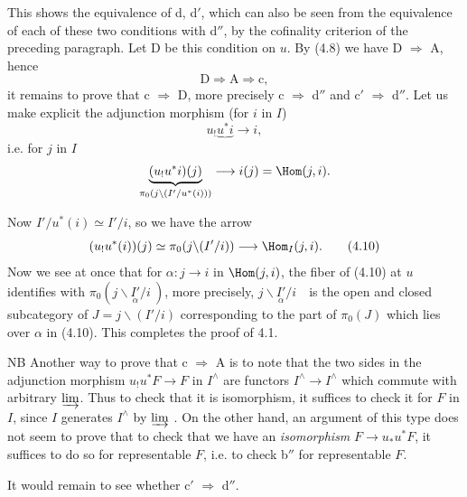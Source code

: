 This shows the equivalence of d, d$'$, which can also be seen from the equivalence of each of these two conditions with d$''$, by the cofinality criterion of the preceding paragraph. Let D be this condition on $u$. By (4.8) we have D $\Longrightarrow$ A, hence %
\[
\mathrm{D} \Longrightarrow \mathrm{A} \Longrightarrow \mathrm{c},
\]
it remains to prove that c $\Longrightarrow$ D, more precisely c $\Longrightarrow$ d$''$ and c$'$ $\Longrightarrow$ d$''$. Let us make explicit the adjunction morphism (for $i$ in $I$)
\[
u_!\underbrace{u^*i} \longrightarrow i,
\]
i.e. for $j$ in $I$
\[
\underbrace{(u_!u^*i)(j)}_{\pi_0(j\backslash(I'/u^*(i)))} \longrightarrow i(j) = \Hom(j,i).
\]

Now $I'/u^*(i) \simeq I'/i$, so we have the arrow
\[
(u_!u^*(i))(j) \simeq \pi_0(j\backslash(I'/i)) \longrightarrow \Hom_I(j,i). \tag*{(4.10)}
\]
Now we see at once that for $\alpha : j \longrightarrow i$ in $\Hom(j,i)$, the fiber of (4.10) at $u$ identifies with $\pi_0(j\backslash\underset{\alpha}{I'}/i\ )$, more precisely, $j\backslash\underset{\alpha}{I'}/i$\ \ is the open and closed subcategory of $J = j\backslash(I'/i)$ corresponding to the part of $\pi_0(J)$ which lies over $\alpha$ in (4.10). This completes the proof of 4.1.

NB Another way to prove that c $\Longrightarrow$ A is to note that the two sides in the adjunction morphism $u_!u^*F \longrightarrow F$ in $I^{\wedge}$ are functors $I^{\wedge} \longrightarrow I^{\wedge}$ which commute with arbitrary $\varinjlim$. Thus to check that it is isomorphism, it suffices to check it for $F$ in $I$, since $I$ generates $I^{\wedge}$ by $\varinjlim$ . On the other hand, an argument of this type does not seem to prove that to check that we have an \textit{isomorphism} $F \longrightarrow u_*u^*F$, it suffices to do so for representable $F$, i.e. to check b$''$ for representable $F$.

It would remain to see whether c$'$ $\Longrightarrow$ d$''$.

